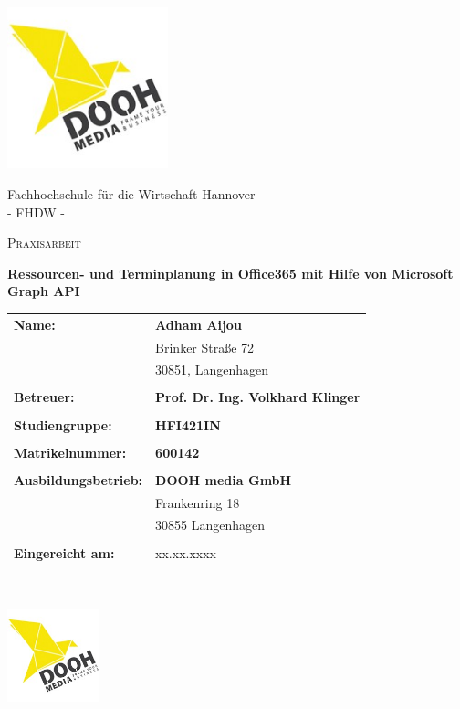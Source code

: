 



\begin{titlepage}
    \centering
    \includegraphics[width=0.35\textwidth]{Bilder/doohMedia}\par\vspace{1cm}
    Fachhochschule für die Wirtschaft Hannover \\
    - FHDW -\\
    {\scshape\Large Praxisarbeit \par}
    \vspace{1cm}
    {\huge\bfseries Ressourcen- und Terminplanung in Office365 mit Hilfe von Microsoft Graph API \par}
    \vspace{1cm}
    \normalsize{
        \begin{tabular}{l l}
            \textbf{Name:} & \textbf{Adham Aijou} \\
            &	Brinker Straße 72 \\
            &	30851, Langenhagen \\
            \\

            \textbf{Betreuer:} & \textbf{Prof. Dr.  Ing. Volkhard Klinger}\\
            \\
            \textbf{Studiengruppe:} & \textbf{HFI421IN}\\
            \\
            \textbf{Matrikelnummer:}  & \textbf{600142} \\
            \\
            \textbf{Ausbildungsbetrieb:}  & \textbf{DOOH media GmbH}\\
            & Frankenring 18\\
            & 30855 Langenhagen    \\
            \\
            \textbf{Eingereicht am:} & xx.xx.xxxx
        \end{tabular}\\
    }
    \vfill
    \flushright \includegraphics[width=0.2\textwidth]{Bilder/doohMedia}\par\vspace{1cm}

\end{titlepage}

